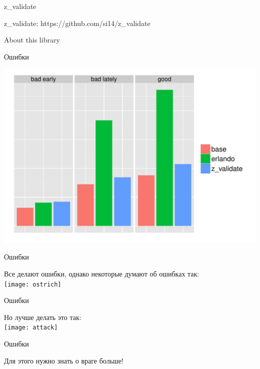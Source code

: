 \documentclass[10pt]{beamer}
\begin{document}
\begin{frame}{z_validate}
  \begin{center}
    \Large
    z_validate: https://github.com/si14/z_validate
  \end{center}
\end{frame}

\begin{frame}{About this library}

\end{frame}

\begin{frame}{Ошибки}
  \begin{center}
    \includegraphics[scale=0.6]{plot.pdf}
  \end{center}
\end{frame}


\begin{frame}{Ошибки}
  \begin{center}
    Все делают ошибки, однако некоторые думают об ошибках так:\vspace{3mm}\\
    \texttt{[image: ostrich]}
  \end{center}
\end{frame}

\begin{frame}{Ошибки}
  \begin{center}
    Но лучше делать это так:\vspace{3mm}\\
    \texttt{[image: attack]}
  \end{center}
\end{frame}

\begin{frame}{Ошибки}
  \begin{center}
    Для этого нужно знать о враге больше!
  \end{center}
\end{frame}
\end{document}
